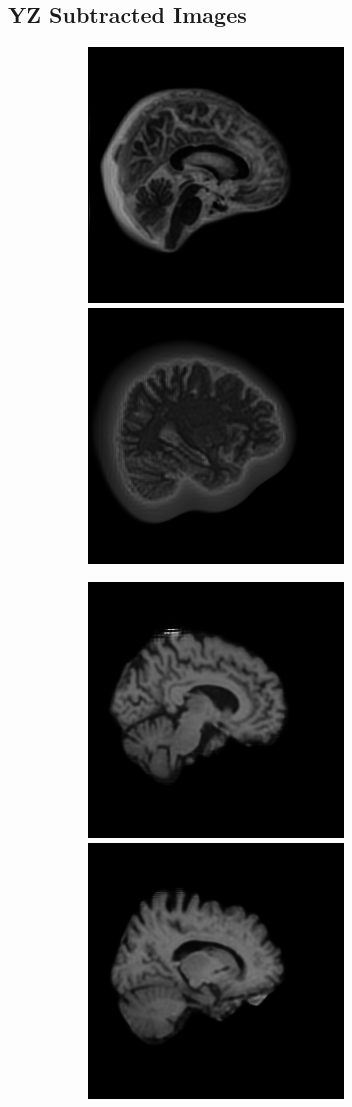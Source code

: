 \documentclass[12pt, fleqn, titlepage]{article}
\newcommand\skipper{1.4pt}
\newcommand\ripper{2.5pt}
\begin{document}
\subsection{YZ Subtracted Images}\label{yz_subtracted_images}
\begin{figure}[H]
	\centering
	\begin{subfigure}[b]{0.7\textwidth}
		\centering
		\includegraphics[width=0.30\linewidth]{imgs/1.5T_bilinear}
		\hskip\skipper
		\includegraphics[width=0.30\linewidth]{imgs/3T_bilinear}
	\end{subfigure}
	\vskip\ripper
	\begin{subfigure}[b]{0.7\textwidth}
		\centering
		\includegraphics[width=0.30\linewidth]{imgs/1.5T_no_noise}
		\hskip\skipper
		\includegraphics[width=0.30\linewidth]{imgs/3T_no_noise}
	\end{subfigure}
\end{figure}
\end{document}
